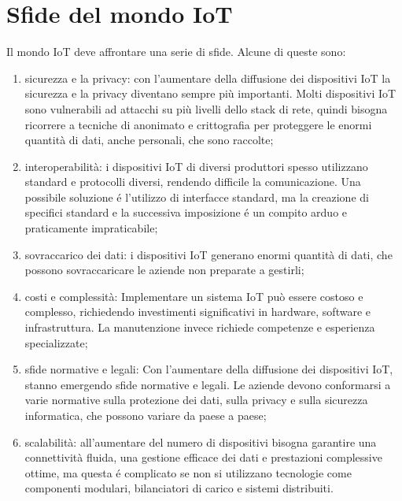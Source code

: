 \section{Sfide del mondo IoT}

Il mondo IoT deve affrontare una serie di sfide. Alcune di queste sono\cite{iot-challenge-1}\cite{iot-challenge-2}: \begin{enumerate}
    \item sicurezza e la privacy: con l'aumentare della diffusione dei dispositivi IoT la sicurezza e la privacy diventano sempre più importanti. Molti dispositivi IoT sono vulnerabili ad attacchi su più livelli dello stack di rete, quindi bisogna ricorrere a tecniche di anonimato e crittografia per proteggere le enormi quantità di dati, anche personali, che sono raccolte;
    \item interoperabilità: i dispositivi IoT di diversi produttori spesso utilizzano standard e protocolli diversi, rendendo difficile la comunicazione. Una possibile soluzione é l'utilizzo di interfacce standard, ma la creazione di specifici standard e la successiva imposizione é un compito arduo e praticamente impraticabile;
    \item sovraccarico dei dati: i dispositivi IoT generano enormi quantità di dati, che possono sovraccaricare le aziende non preparate a gestirli;
    \item costi e complessità: Implementare un sistema IoT può essere costoso e complesso, richiedendo investimenti significativi in hardware, software e infrastruttura. La manutenzione invece richiede competenze e esperienza specializzate;
    \item sfide normative e legali: Con l'aumentare della diffusione dei dispositivi IoT, stanno emergendo sfide normative e legali. Le aziende devono conformarsi a varie normative sulla protezione dei dati, sulla privacy e sulla sicurezza informatica, che possono variare da paese a paese;
    \item scalabilità: all'aumentare del numero di dispositivi bisogna garantire una connettività fluida, una gestione efficace dei dati e prestazioni complessive ottime, ma questa é complicato se non si utilizzano tecnologie come componenti modulari, bilanciatori di carico e sistemi distribuiti.
\end{enumerate} 
